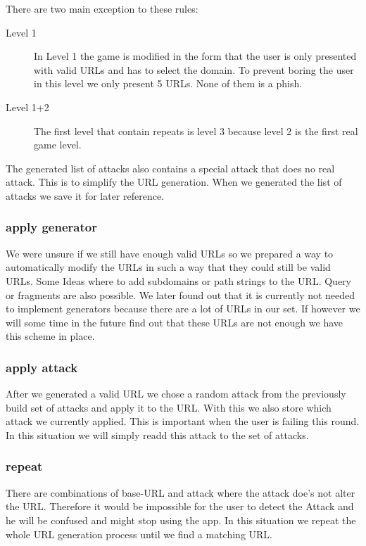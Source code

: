 There are two main exception to these rules:
\begin{description}
\item[Level 1] In Level 1 the game is modified in the form that the user is only presented with valid URLs and has to select the domain.
To prevent boring the user in this level we only present 5 URLs.
None of them is a phish.
\item[Level 1+2] The first level that contain repeats is level 3 because level 2 is the first real game level.
\end{description}

The generated list of attacks also contains a special attack that does no real attack. This is to simplify the URL generation. When we generated the list of attacks we save it for later reference.
\subsubsection{apply generator}
We were unsure if we still have enough valid URLs so we prepared a way to automatically modify the URLs in such a way that they could still be valid URLs. Some Ideas where to add subdomains or path strings to the URL. Query or fragments are also possible. We later found out that it is currently not needed to implement generators because there are a lot of URLs in our set. If however we will some time in the future find out that these URLs are not enough we have this scheme in place.
\subsubsection{apply attack}
After we generated a valid URL we chose a random attack from the previously build set of attacks and apply it to the URL. With this we also store which attack we currently applied. This is important when the user is failing this round. In this situation we will simply readd this attack to the set of attacks.
\subsubsection{repeat}
There are combinations of base-URL and attack where the attack doe's not alter the URL.
Therefore it would be impossible for the user to detect the Attack and he will be confused and might stop using the app.
In this situation we repeat the whole URL generation process until we find a matching URL.